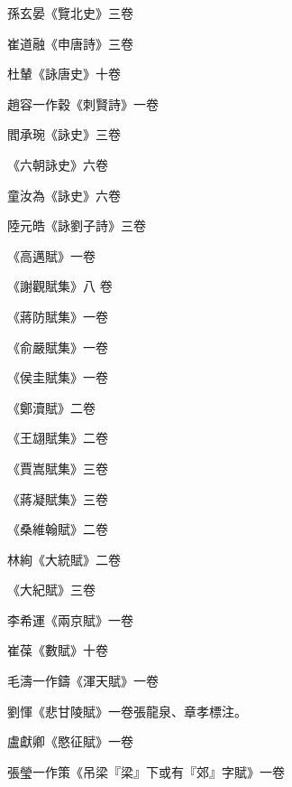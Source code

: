 \begin{pinyinscope}
 孫玄晏《覽北史》三卷



 崔道融《申唐詩》三卷



 杜輦《詠唐史》十卷



 趙容一作穀《刺賢詩》一卷



 閻承琬《詠史》三卷



 《六朝詠史》六卷



 童汝為《詠史》六卷



 陸元皓《詠劉子詩》三卷



 《高邁賦》一卷



 《謝觀賦集》八
 卷



 《蔣防賦集》一卷



 《俞嚴賦集》一卷



 《侯圭賦集》一卷



 《鄭瀆賦》二卷



 《王翃賦集》二卷



 《賈嵩賦集》三卷



 《蔣凝賦集》三卷



 《桑維翰賦》二卷



 林絢《大統賦》二卷



 《大紀賦》三卷



 李希運《兩京賦》一卷



 崔葆《數賦》十卷



 毛濤一作鑄《渾天賦》一卷



 劉惲《悲甘陵賦》一卷張龍泉、章孝標注。



 盧獻卿《愍征賦》一卷



 張瑩一作策《吊梁『梁』下或有『郊』字賦》一卷




\end{pinyinscope}
